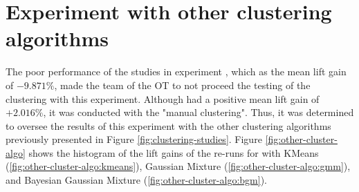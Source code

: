 \section{Experiment \nameExperimentII{} with other clustering algorithms}

The poor performance of the studies in experiment \nameExperimentI{}, which as the mean lift gain of $-9.871\%$, made the team of the OT to not proceed the testing of the clustering with this experiment. Although \nameExperimentII{} had a positive mean lift gain of $+2.016\%$, it was conducted with the "manual clustering". Thus, it was determined to oversee the results of this experiment with the other clustering algorithms previously presented in Figure \ref{fig:clustering-studies}. Figure \ref{fig:other-cluster-algo} shows the histogram of the lift gains of the re-runs for \nameExperimentII{} with KMeans (\ref{fig:other-cluster-algo:kmeans}), Gaussian Mixture (\ref{fig:other-cluster-algo:gmm}), and Bayesian Gaussian Mixture (\ref{fig:other-cluster-algo:bgm}).

